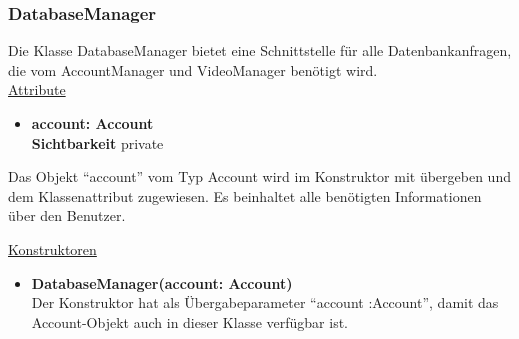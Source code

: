 \subsubsection{DatabaseManager} \label{service:klasse:DatabaseManager}
Die Klasse DatabaseManager bietet eine Schnittstelle für alle Datenbankanfragen, die vom AccountManager und VideoManager benötigt wird. \hfill\\

\underline{Attribute}
\begin{itemize}
\itemsep0pt
\item \textbf{account: Account} \hfill\\ 
\textbf{Sichtbarkeit} private
\end{itemize}

Das Objekt ``account'' vom Typ Account wird im Konstruktor mit übergeben und dem Klassenattribut zugewiesen. Es beinhaltet alle benötigten Informationen über den Benutzer. 

\underline{Konstruktoren}
\begin{itemize}
\itemsep0pt
\item \textbf{DatabaseManager(account: Account)} \hfill\\
Der Konstruktor hat als Übergabeparameter ``account :Account'', damit das Account-Objekt auch in dieser Klasse verfügbar ist.
\end{itemize}

